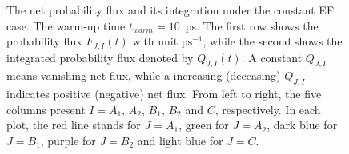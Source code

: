 \documentclass[a4paper,preprint,unsortedaddress,onecolumn]{revtex4-1}
\begin{document}
\begin{figure}
  \caption{
    The net probability flux and its integration under the constant EF case.
    The warm-up time $t_{warm} = 10$~ps.
    The first row shows the probability flux $F_{J,I}(t)$ with unit $\textrm{ps}^{-1}$, while the second
    shows the integrated  probability flux denoted by $Q_{J,I}(t)$.
    A constant $Q_{J,I}$ means vanishing net flux, while a increasing (deceasing)
    $Q_{J,I}$ indicates positive (negative) net flux.
    From left to right, the five
    columns present $I = A_1$, $A_2$, $B_1$, $B_2$ and
    $C$, respectively. In each plot, the red line stands for $J=A_1$,
    green for $J=A_2$, dark blue for $J=B_1$, purple for $J=B_2$ and light blue
    for $J=C$. 
    }
  \label{fig:tmp6}
\end{figure}

\end{document}
